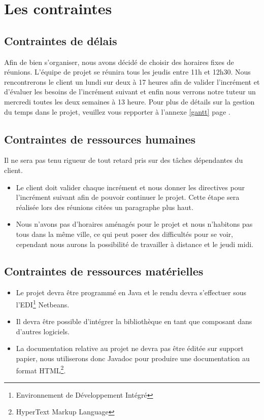 \documentclass[12pt,a4paper,openany]{article}
\begin{document}
	\section{Les contraintes}
	\subsection{Contraintes de délais}
	Afin de bien s'organiser, nous avons décidé de choisir des horaires fixes de réunions. L'équipe de projet se réunira tous
	les jeudis entre 11h et 12h30. Nous rencontrerons le client un lundi sur deux à 17 heures afin de valider l'incrément et d'évaluer les
	besoins de l'incrément suivant et enfin nous verrons notre tuteur un mercredi toutes les deux semaines à 13 heure. 
	Pour plus de détails sur la gestion du temps dans le projet, veuillez vous repporter à l'annexe \ref{gantt} page \pageref{gantt}.
	
	\subsection{Contraintes de ressources humaines}
	Il ne sera pas tenu rigueur de tout retard pris sur des tâches dépendantes du client.
	\begin{itemize}
		\item Le client doit valider chaque incrément et nous donner les directives pour l'incrément suivant afin de pouvoir continuer le projet. Cette étape sera réalisée lors des réunions citées un paragraphe plus haut.
		\item Nous n'avons pas d'horaires aménagés pour le projet et nous n'habitons pas tous dans la même ville, ce qui peut poser des difficultés pour se voir, cependant nous aurons la possibilité de travailler à distance et le jeudi midi.
	\end{itemize}
	\subsection{Contraintes de ressources matérielles}
	\begin{itemize}
		\item Le projet devra être programmé en Java et le rendu devra s'effectuer sous l'EDI\footnote{Environnement de Développement Intégré} Netbeans. 
		\item Il devra être possible d'intégrer la bibliothèque en tant que composant dans d'autres logiciels. 
		\item La documentation relative au projet ne devra pas être éditée sur support papier, nous utili\-serons donc Javadoc pour produire une documentation 
			au format HTML\footnote{HyperText Markup Language}.  
	\end{itemize}
	
\end{document}
